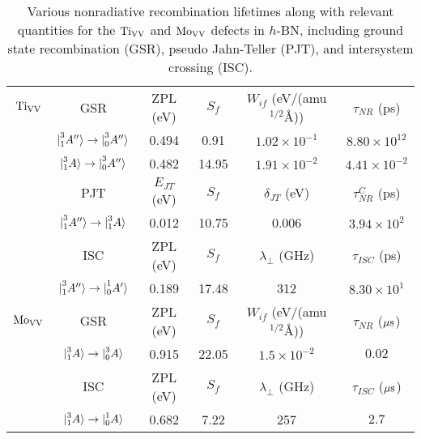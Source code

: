 \begin{table}
    \footnotesize
    \centering

\begin{tabular}{cccccc}
\hline \hline
    $\text{Ti}_{\text{V}\text{V}}$ & GSR & ZPL (eV) & $S_f$ & $W_{if}$ (eV/(amu$^{1/2}\si{\angstrom}$)) & $\tau_{NR}$ (ps) \\

    & $\ket{\prescript{3}{1}{A''}} \rightarrow \ket{\prescript{3}{0}{A''}}$  & 0.494 & 0.91 & $1.02\times 10^{-1}$ & $8.80\times 10^{12}$ \\
    & $\ket{\prescript{3}{1}{A}} \rightarrow \ket{\prescript{3}{0}{A''}}$ & 0.482 & 14.95 & $1.91\times 10^{-2}$ & $4.41\times 10^{-2}$ \\

    & PJT & $E_{JT}$ (eV) & $S_f$  & $\delta_{JT}$ (eV) & $\tau^C_{NR}$ (ps) \\

    & $\ket{\prescript{3}{1}{A''}} \rightarrow \ket{\prescript{3}{1}{A}}$ & 0.012 & 10.75 & 0.006 & $3.94\times 10^{2}$ \\

    & ISC & ZPL (eV) & $S_f$ & $\lambda_{\perp}$ (GHz) & $\tau_{ISC}$ (ps) \\

    & $\ket{\prescript{3}{1}{A''}} \rightarrow \ket{\prescript{1}{0}{A'}}$ & 0.189 & 17.48 & 312 & $8.30\times 10^{1}$ \\

\hline
    $\text{Mo}_{\text{V}\text{V}}$ & GSR & ZPL (eV) & $S_f$ & $W_{if}$ (eV/(amu$^{1/2}\si{\angstrom}$)) & $\tau_{NR}$ ($\rm \mu s$) \\

    & $\ket{\prescript{3}{1}{A}} \rightarrow \ket{\prescript{3}{0}{A}}$  & 0.915 & 22.05 & $1.5\times 10^{-2}$ & $0.02$ \\

    & ISC & ZPL (eV) & $S_f$ & $\lambda_{\perp}$ (GHz) & $\tau_{ISC}$ ($\rm \mu s$) \\

    & $\ket{\prescript{3}{1}{A}} \rightarrow \ket{\prescript{1}{0}{A}}$ & 0.682 & 7.22 & 257 & $2.7$ \\

\hline \hline
\end{tabular}

    \caption{
Various nonradiative recombination lifetimes along with relevant quantities for the $\text{Ti}_{\text{V}\text{V}}$ and $\text{Mo}_{\text{V}\text{V}}$ defects in $h$-BN, including ground state recombination (GSR), pseudo Jahn-Teller (PJT), and intersystem crossing (ISC).
    }
    \label{table:nonrad}
\end{table}

